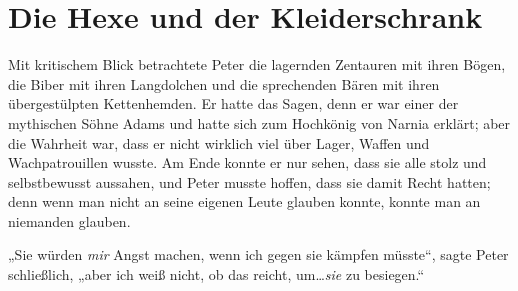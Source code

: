 \section{Die Hexe und der Kleiderschrank}

Mit kritischem Blick betrachtete Peter die lagernden Zentauren mit ihren Bögen, die Biber mit ihren Langdolchen und die sprechenden Bären mit ihren übergestülpten Kettenhemden. Er hatte das Sagen, denn er war einer der mythischen Söhne Adams und hatte sich zum Hochkönig von Narnia erklärt; aber die Wahrheit war, dass er nicht wirklich viel über Lager, Waffen und Wachpatrouillen wusste. Am Ende konnte er nur sehen, dass sie alle stolz und selbstbewusst aussahen, und Peter musste hoffen, dass sie damit Recht hatten; denn wenn man nicht an seine eigenen Leute glauben konnte, konnte man an niemanden glauben.

„Sie würden \emph{mir} Angst machen, wenn ich gegen sie kämpfen müsste“, sagte Peter schließlich, „aber ich weiß nicht, ob das reicht, um…\emph{sie} zu besiegen.“

